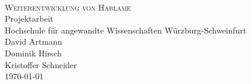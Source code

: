 \begin{titlepage}
   	\mbox{}\vspace{5\baselineskip}\\
   	\rmfamily\huge
   	\centering
	\textsc{Weiterentwicklung von Hablame}
	\\[3ex]
   	Projektarbeit
   	\rmfamily\Large
   	\vspace{1\baselineskip}\\
	\vspace{3\baselineskip}
	Hochschule für angewandte Wissenschaften Würzburg-Schweinfurt
   	\vspace{5\baselineskip}\\
   	\rmfamily\Large
   	David Artmann\\
   	\rmfamily\Large
   	Dominik Hirsch\\
   	\rmfamily\Large
   	Kristoffer Schneider
   	\vspace{1\baselineskip}\\
   	\today
\end{titlepage}